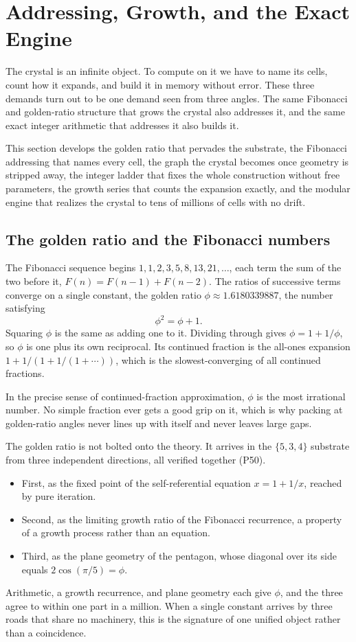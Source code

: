 \section{Addressing, Growth, and the Exact Engine}

The crystal is an infinite object. To compute on it we have to name its cells, count how it expands, and
build it in memory without error. These three demands turn out to be one demand seen from three angles. The
same Fibonacci and golden-ratio structure that grows the crystal also addresses it, and the same exact
integer arithmetic that addresses it also builds it.

This section develops the golden ratio that pervades
the substrate, the Fibonacci addressing that names every cell, the graph the crystal becomes once geometry
is stripped away, the integer ladder that fixes the whole construction without free parameters, the growth
series that counts the expansion exactly, and the modular engine that realizes the crystal to tens of
millions of cells with no drift.

\subsection{The golden ratio and the Fibonacci numbers}

The Fibonacci sequence begins $1, 1, 2, 3, 5, 8, 13, 21, \dots$, each term the sum of the two before it,
$F(n) = F(n-1) + F(n-2)$. The ratios of successive terms converge on a single constant, the golden ratio
$\phi \approx 1.6180339887$, the number satisfying
\begin{equation}
  \phi^2 = \phi + 1.
\end{equation}
Squaring $\phi$ is the same as adding one to it. Dividing through gives $\phi = 1 + 1/\phi$, so $\phi$ is one
plus its own reciprocal. Its continued fraction is the all-ones expansion $1 + 1/(1 + 1/(1 + \cdots))$, which
is the slowest-converging of all continued fractions.

In the precise sense of continued-fraction
approximation, $\phi$ is the most irrational number. No simple fraction ever gets a good grip on it, which is
why packing at golden-ratio angles never lines up with itself and never leaves large gaps.

The golden ratio is not bolted onto the theory. It arrives in the $\{5,3,4\}$ substrate from three
independent directions, all verified together (P50).
\begin{itemize}
  \item First, as the fixed point of the self-referential equation $x = 1 + 1/x$, reached by pure iteration.
  \item Second, as the limiting growth ratio of the Fibonacci recurrence, a property of a growth process rather than an equation.
  \item Third, as the plane geometry of the pentagon, whose diagonal over its side equals $2\cos(\pi/5) = \phi$.
\end{itemize}
Arithmetic, a growth recurrence, and
plane geometry each give $\phi$, and the three agree to within one part in a million. When a single constant
arrives by three roads that share no machinery, this is the signature of one unified object rather than a
coincidence.

